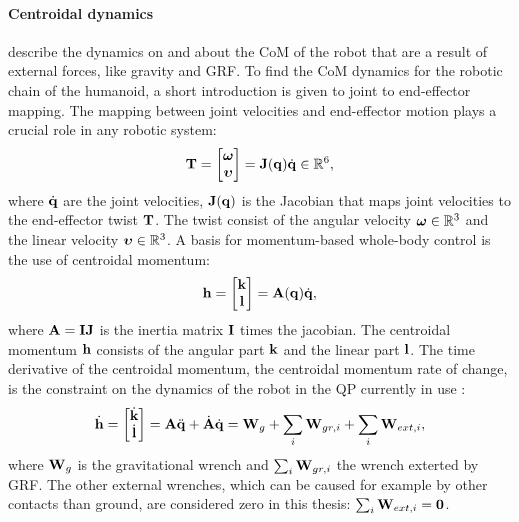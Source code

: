 \paragraph{Centroidal dynamics} \cite{orin2013centroidal} describe the dynamics on and about the \ac{CoM} of the robot that are a result of external forces, like gravity and \ac{GRF}. To find the \ac{CoM} dynamics for the robotic chain of the humanoid, a short introduction is given to joint to end-effector mapping. The mapping between joint velocities and end-effector motion plays a crucial role in any robotic system:
\begin{equation}\label{eq:jacobian}
\mathbf{T}=\begin{bmatrix}\boldsymbol{\omega} \\ \boldsymbol{\upsilon} \end{bmatrix} = \mathbf{J}(\mathbf{q})\dot{\mathbf{q}} \in \mathbb{R}^6,
\end{equation}
where $\dot{\mathbf{q}}$ are the joint velocities, $\mathbf{J}(\mathbf{q})$ is the Jacobian that maps joint velocities to the end-effector twist $\mathbf{T}$. The twist consist of the angular velocity $\boldsymbol{\omega} \in \mathbb{R}^3$ and the linear velocity $\boldsymbol{\upsilon} \in \mathbb{R}^3$. A basis for momentum-based whole-body control is the use of centroidal momentum:
\begin{equation}
\mathbf{h}=\begin{bmatrix}\mathbf{k} \\ \mathbf{l} \end{bmatrix} =\mathbf{A}(\mathbf{q})\dot{\mathbf{q}},
\end{equation}
 where $\mathbf{A}=\mathbf{I}\mathbf{J}$ is the inertia matrix $\mathbf{I}$ times the jacobian. The centroidal momentum $\mathbf{h}$ consists of the angular part $\mathbf{k}$ and the linear part $\mathbf{l}$. The time derivative of the centroidal momentum, the centroidal momentum rate of change, is the constraint on the dynamics of the robot in the \ac{QP} currently in use \cite{koolen2016design}:
\begin{equation}
\dot{\mathbf{h}}=\begin{bmatrix}\dot{\mathbf{k}}\\ \dot{\mathbf{l}} \end{bmatrix} =\mathbf{A}\ddot{\mathbf{q}} +\dot{\mathbf{A}}\dot{\mathbf{q}} = \mathbf{W}_g + \sum_i\mathbf{W}_{gr,i} + \sum_i \mathbf{W}_{ext,i}, 
\end{equation}
where $\mathbf{W}_g$ is the gravitational wrench and $\sum_i\mathbf{W}_{gr,i}$ the wrench exterted by \ac{GRF}. The other external wrenches, which can be caused for example by other contacts than ground, are considered zero in this thesis: $\sum_i \mathbf{W}_{ext,i}=\mathbf{0}$.
